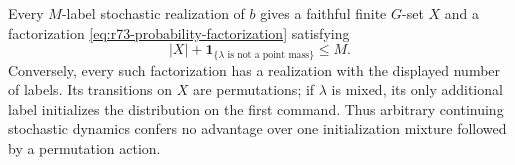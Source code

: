 \begin{theorem}\label{thm:r73-normal-form}
Every $M$-label stochastic realization of $b$ gives a faithful finite $G$-set
$X$ and a factorization \eqref{eq:r73-probability-factorization} satisfying
\begin{equation}\label{eq:r73-initialization-charge}
 |X|+\mathbf 1_{\{\lambda\text{ is not a point mass}\}}\le M.
\end{equation}
Conversely, every such factorization has a realization with the displayed
number of labels. Its transitions on $X$ are permutations; if $\lambda$ is
mixed, its only additional label initializes the distribution on the first
command. Thus arbitrary continuing stochastic dynamics confers no advantage
over one initialization mixture followed by a permutation action.
\end{theorem}

